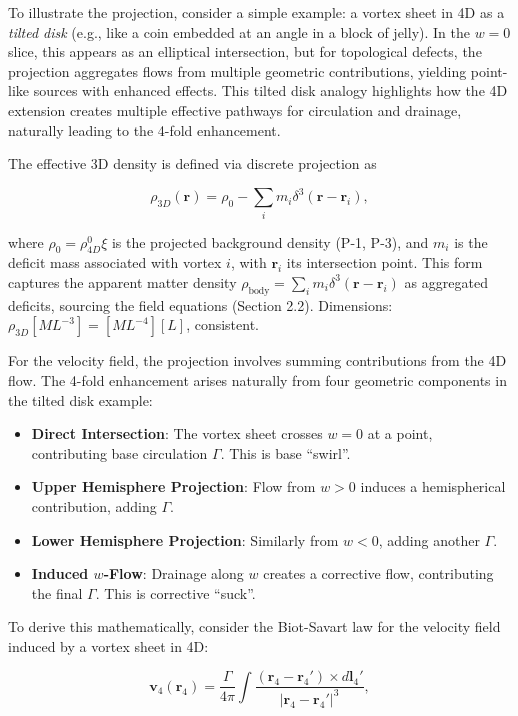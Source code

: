 To illustrate the projection, consider a simple example: a vortex sheet in 4D as a \emph{tilted disk} (e.g., like a coin embedded at an angle in a block of jelly). In the $w=0$ slice, this appears as an elliptical intersection, but for topological defects, the projection aggregates flows from multiple geometric contributions, yielding point-like sources with enhanced effects. This tilted disk analogy highlights how the 4D extension creates multiple effective pathways for circulation and drainage, naturally leading to the 4-fold enhancement.

The effective 3D density is defined via discrete projection as

\begin{equation}
\rho_{3D}(\mathbf{r}) = \rho_0 - \sum_i m_i \delta^3(\mathbf{r} - \mathbf{r}_i),
\end{equation}

where $\rho_0 = \rho_{4D}^0 \xi$ is the projected background density (P-1, P-3), and $m_i$ is the deficit mass associated with vortex $i$, with $\mathbf{r}_i$ its intersection point. This form captures the apparent matter density $\rho_{\text{body}} = \sum_i m_i \delta^3(\mathbf{r} - \mathbf{r}_i)$ as aggregated deficits, sourcing the field equations (Section 2.2). Dimensions: $\rho_{3D} [M L^{-3}] = [M L^{-4}] [L]$, consistent.

For the velocity field, the projection involves summing contributions from the 4D flow. The 4-fold enhancement arises naturally from four geometric components in the tilted disk example:

\begin{itemize}
\item \textbf{Direct Intersection}: The vortex sheet crosses $w=0$ at a point, contributing base circulation $\Gamma$. This is base ``swirl''.
\item \textbf{Upper Hemisphere Projection}: Flow from $w>0$ induces a hemispherical contribution, adding $\Gamma$.
\item \textbf{Lower Hemisphere Projection}: Similarly from $w<0$, adding another $\Gamma$.
\item \textbf{Induced $w$-Flow}: Drainage along $w$ creates a corrective flow, contributing the final $\Gamma$. This is corrective ``suck''.
\end{itemize}

To derive this mathematically, consider the Biot-Savart law for the velocity field induced by a vortex sheet in 4D:

\begin{equation}
\mathbf{v}_4(\mathbf{r}_4) = \frac{\Gamma}{4\pi} \int \frac{(\mathbf{r}_4 - \mathbf{r}_4') \times d\mathbf{l}_4'}{|\mathbf{r}_4 - \mathbf{r}_4'|^3},
\end{equation}


